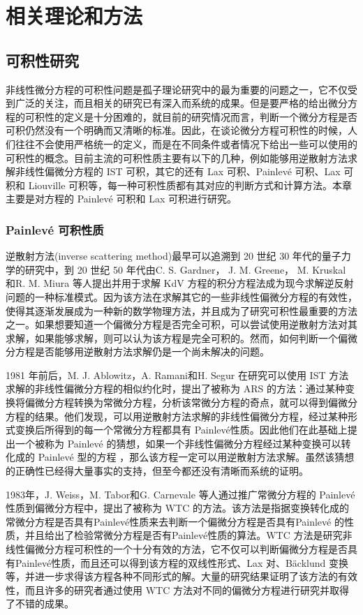 
\chapter{相关理论和方法}
\section{可积性研究}
非线性微分方程的可积性问题是孤子理论研究中的最为重要的问题之一，它不仅受到广泛的关注，而且相关的研究已有深入而系统的成果。但是要严格的给出微分方程的可积性的定义是十分困难的，就目前的研究情况而言，判断一个微分方程是否可积仍然没有一个明确而又清晰的标准。因此，在谈论微分方程可积性的时候，人们往往不会使用严格统一的定义，而是在不同条件或者情况下给出一些可以使用的可积性的概念。目前主流的可积性质主要有以下的几种，例如能够用逆散射方法求解非线性偏微分方程的 IST 可积，其它的还有 Lax 可积、Painlev\'{e} 可积、Lax 可积和 Liouville 可积等，每一种可积性质都有其对应的判断方式和计算方法。本章主要是对方程的 Painlev\'{e} 可积和 Lax 可积进行研究。

\subsection{Painlev\'{e} 可积性质}
逆散射方法(inverse scattering method)最早可以追溯到 20 世纪 30 年代的量子力学的研究中，到 20 世纪 50 年代由C. S. Gardner， J. M. Greene， M. Kruskal 和R. M. Miura 等人提出并用于求解 KdV 方程的积分方程法成为现今求解逆反射问题的一种标准模式。因为该方法在求解其它的一些非线性偏微分方程的有效性，使得其逐渐发展成为一种新的数学物理方法，并且成为了研究可积性最重要的方法之一。如果想要知道一个偏微分方程是否完全可积，可以尝试使用逆散射方法对其求解，如果能够求解，则可以认为该方程是完全可积的。然而，如何判断一个偏微分方程是否能够用逆散射方法求解仍是一个尚未解决的问题。

1981 年前后，M. J. Ablowitz，A. Ramani和H. Segur 在研究可以使用 IST 方法求解的非线性偏微分方程的相似约化时，提出了被称为 ARS 的方法：通过某种变换将偏微分方程转换为常微分方程，分析该常微分方程的奇点，就可以得到偏微分方程的结果。他们发现，可以用逆散射方法求解的非线性偏微分方程，经过某种形式变换后所得到的每一个常微分方程都具有 Painlev\'{e}性质。因此他们在此基础上提出一个被称为 Painlev\'{e} 的猜想，如果一个非线性偏微分方程经过某种变换可以转化成的 Painlev\'{e} 型的方程 ，那么该方程一定可以用逆散射方法求解。虽然该猜想的正确性已经得大量事实的支持，但至今都还没有清晰而系统的证明。

1983年，J. Weiss，M. Tabor和G. Carnevale 等人通过推广常微分方程的 Painlev\'{e} 性质到偏微分方程中，提出了被称为 WTC 的方法。该方法是指据变换转化成的常微分方程是否具有Painlev\'{e}性质来去判断一个偏微分方程是否具有Painlev\'{e} 的性质，并且给出了检验常微分方程是否有Painlev\'{e}性质的算法。WTC 方法是研究非线性偏微分方程可积性的一个十分有效的方法，它不仅可以判断偏微分方程是否具有Painlev\'{e}性质，而且还可以得到该方程的双线性形式、Lax 对、B\"{a}cklund 变换等，并进一步求得该方程各种不同形式的解。大量的研究结果证明了该方法的有效性，而且许多的研究者通过使用 WTC 方法对不同的偏微分方程进行研究并取得了不错的成果。

